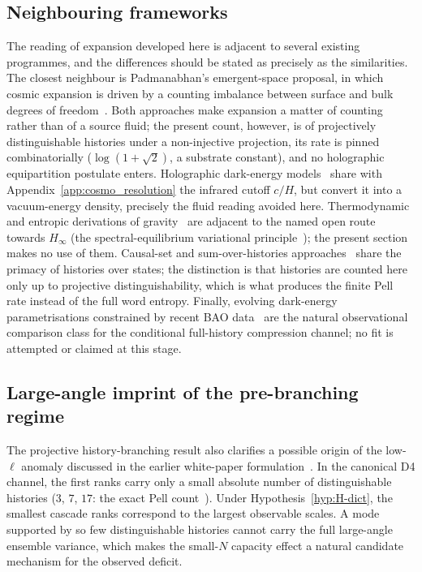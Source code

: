 \subsection{Neighbouring frameworks}
\label{subsec:branching-neighbours}

The reading of expansion developed here is adjacent to several existing programmes, and the differences should
be stated as precisely as the similarities.
The closest neighbour is Padmanabhan's emergent-space proposal, in which cosmic expansion is driven by a
counting imbalance between surface and bulk degrees of freedom~\cite{Padmanabhan2012,Padmanabhan2010}.
Both approaches make expansion a matter of counting rather than of a source fluid; the present count, however,
is of projectively distinguishable histories under a non-injective projection, its rate is pinned
combinatorially ($\log(1+\sqrt2)$, a substrate constant), and no holographic equipartition postulate enters.
Holographic dark-energy models~\cite{Li2004} share with Appendix~\ref{app:cosmo_resolution} the infrared
cutoff $c/H$, but convert it into a vacuum-energy density, precisely the fluid reading avoided here.
Thermodynamic and entropic derivations of gravity~\cite{Jacobson1995,Verlinde2011} are adjacent to the named
open route towards $H_\infty$ (the spectral-equilibrium variational principle~\cite{Beau2026Thermodynamics});
the present section makes no use of them.
Causal-set and sum-over-histories approaches~\cite{Bombelli1987} share the primacy of histories over states;
the distinction is that histories are counted here only up to projective distinguishability, which is what
produces the finite Pell rate instead of the full word entropy.
Finally, evolving dark-energy parametrisations constrained by recent BAO data~\cite{DESI2024} are the natural
observational comparison class for the conditional full-history compression channel; no fit is attempted or
claimed at this stage.

\subsection{Large-angle imprint of the pre-branching regime}
\label{subsec:low-ell-prebranching}

The projective history-branching result also clarifies a possible origin of the low-$\ell$ anomaly discussed
in the earlier white-paper formulation~\cite{Cosmochrony}.
In the canonical D4 channel, the first ranks carry only a small absolute number of distinguishable
histories ($3$, $7$, $17$: the exact Pell count~\cite{Beau2026dhc}).
Under Hypothesis~\ref{hyp:H-dict}, the smallest cascade ranks correspond to the largest observable scales.
A mode supported by so few distinguishable histories cannot carry the full large-angle ensemble variance,
which makes the small-$N$ capacity effect a natural candidate mechanism for the observed deficit.

